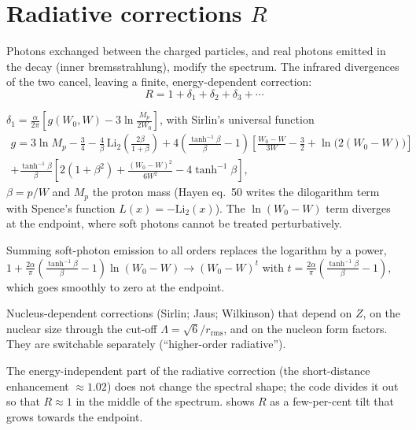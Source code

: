 \section{Radiative corrections $R$}
Photons exchanged between the charged particles, and real photons emitted in the decay (inner bremsstrahlung), modify the spectrum. The infrared divergences of the two cancel, leaving a finite, energy-dependent correction:
\begin{equation}
R = 1 + \delta_1 + \delta_2 + \delta_3 + \cdots
\end{equation}
\begin{description}[leftmargin=1.2em]
\item[Order $\alpha$ (Sirlin)] $\delta_1 = \frac{\alpha}{2\pi}\left[g(W_0,W) - 3\ln\frac{M_p}{2W_0}\right]$, with Sirlin's universal function
\begin{multline}
g = 3\ln M_p - \tfrac34 - \frac{4}{\beta}\,\mathrm{Li}_2\!\left(\frac{2\beta}{1+\beta}\right) + 4\left(\frac{\tanh^{-1}\beta}{\beta} - 1\right)\left[\frac{W_0-W}{3W} - \frac32 + \ln\big(2(W_0-W)\big)\right]\\
+ \frac{\tanh^{-1}\beta}{\beta}\left[2(1+\beta^2) + \frac{(W_0-W)^2}{6W^2} - 4\tanh^{-1}\beta\right],
\end{multline}
$\beta = p/W$ and $M_p$ the proton mass (Hayen eq.\ 50 writes the dilogarithm term with Spence's function $L(x) = -\mathrm{Li}_2(x)$). The $\ln(W_0 - W)$ term diverges at the endpoint, where soft photons cannot be treated perturbatively.
\item[Endpoint resummation (Repko--Wu)] Summing soft-photon emission to all orders replaces the logarithm by a power, $1 + \frac{2\alpha}{\pi}(\frac{\tanh^{-1}\beta}{\beta}-1)\ln(W_0-W) \to (W_0-W)^{t}$ with $t = \frac{2\alpha}{\pi}\left(\frac{\tanh^{-1}\beta}{\beta}-1\right)$, which goes smoothly to zero at the endpoint.
\item[Order $Z\alpha^2$ and $Z^2\alpha^3$] Nucleus-dependent corrections (Sirlin; Jaus; Wilkinson) that depend on $Z$, on the nuclear size through the cut-off $\Lambda = \sqrt6/r_\text{rms}$, and on the nucleon form factors. They are switchable separately (``higher-order radiative'').
\end{description}
The energy-independent part of the radiative correction (the short-distance enhancement $\approx1.02$) does not change the spectral shape; the code divides it out so that $R\approx1$ in the middle of the spectrum.  shows $R$ as a few-per-cent tilt that grows towards the endpoint.

